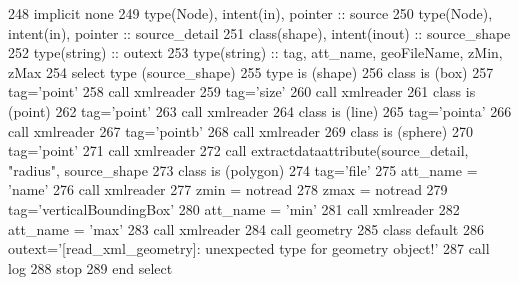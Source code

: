 \begin{DoxyCode}
248     \textcolor{keywordtype}{implicit none}
249     \textcolor{keywordtype}{type}(Node), \textcolor{keywordtype}{intent(in)}, \textcolor{keywordtype}{pointer} :: source
250     \textcolor{keywordtype}{type}(Node), \textcolor{keywordtype}{intent(in)}, \textcolor{keywordtype}{pointer} :: source\_detail
251     \textcolor{keywordtype}{class}(shape), \textcolor{keywordtype}{intent(inout)} :: source\_shape
252     \textcolor{keywordtype}{type}(string) :: outext
253     \textcolor{keywordtype}{type}(string) :: tag, att\_name, geoFileName, zMin, zMax 
254     \textcolor{keywordflow}{select type} (source\_shape)
255 \textcolor{keywordflow}{    type is} (shape)
256 \textcolor{keywordflow}{    class is} (box)
257         tag=\textcolor{stringliteral}{'point'}
258         \textcolor{keyword}{call }xmlreader%
259         tag=\textcolor{stringliteral}{'size'}
260         \textcolor{keyword}{call }xmlreader%
261 \textcolor{keywordflow}{    class is} (point)
262         tag=\textcolor{stringliteral}{'point'}
263         \textcolor{keyword}{call }xmlreader%
264 \textcolor{keywordflow}{    class is} (line)
265         tag=\textcolor{stringliteral}{'pointa'}
266         \textcolor{keyword}{call }xmlreader%
267         tag=\textcolor{stringliteral}{'pointb'}
268         \textcolor{keyword}{call }xmlreader%
269 \textcolor{keywordflow}{    class is} (sphere)
270         tag=\textcolor{stringliteral}{'point'}
271         \textcolor{keyword}{call }xmlreader%
272         \textcolor{keyword}{call }extractdataattribute(source\_detail, \textcolor{stringliteral}{"radius"}, source\_shape%
273 \textcolor{keywordflow}{    class is} (polygon)
274         tag=\textcolor{stringliteral}{'file'}
275         att\_name = \textcolor{stringliteral}{'name'}
276         \textcolor{keyword}{call }xmlreader%
277         zmin = notread
278         zmax = notread
279         tag=\textcolor{stringliteral}{'verticalBoundingBox'}
280         att\_name = \textcolor{stringliteral}{'min'}
281         \textcolor{keyword}{call }xmlreader%
282         att\_name = \textcolor{stringliteral}{'max'}
283         \textcolor{keyword}{call }xmlreader%
284         \textcolor{keyword}{call }geometry%
285 \textcolor{keywordflow}{        class default}
286         outext=\textcolor{stringliteral}{'[read\_xml\_geometry]: unexpected type for geometry object!'}
287         \textcolor{keyword}{call }log%
288         stop
289 \textcolor{keywordflow}{    end select}
\end{DoxyCode}
